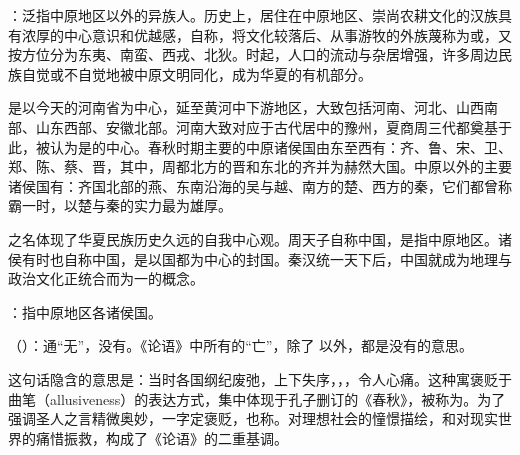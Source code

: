 {
\begin{lyblobitemize}
\item {}：泛指中原地区以外的异族人。历史上，居住在中原地区、崇尚农耕文化的汉族具有浓厚的中心意识和优越感，自称，将文化较落后、从事游牧的外族蔑称为或，又按方位分为东夷、南蛮、西戎、北狄。时起，人口的流动与杂居增强，许多周边民族自觉或不自觉地被中原文明同化，成为华夏的有机部分。

是以今天的河南省为中心，延至黄河中下游地区，大致包括河南、河北、山西南部、山东西部、安徽北部。河南大致对应于古代居中的豫州，夏商周三代都奠基于此，被认为是的中心。春秋时期主要的中原诸侯国由东至西有：齐、鲁、宋、卫、郑、陈、蔡、晋，其中，周都北方的晋和东北的齐并为赫然大国。中原以外的主要诸侯国有：齐国北部的燕、东南沿海的吴与越、南方的楚、西方的秦，它们都曾称霸一时，以楚与秦的实力最为雄厚。 %

之名体现了华夏民族历史久远的自我中心观。周天子自称中国，是指中原地区。诸侯有时也自称中国，是以国都为中心的封国。秦汉统一天下后，中国就成为地理与政治文化正统合而为一的概念。

\item {}：指中原地区各诸侯国。
\item {}（）：通“无”，没有。《论语》中所有的“亡”，除了  以外，都是没有的意思。
\end{lyblobitemize}
这句话隐含的意思是：当时各国纲纪废弛，上下失序，，，令人心痛。这种寓褒贬于曲笔（allusiveness）的表达方式，集中体现于孔子删订的《春秋》，被称为。为了强调圣人之言精微奥妙，一字定褒贬，也称。对理想社会的憧憬描绘，和对现实世界的痛惜振救，构成了《论语》的二重基调。
}
{} %


